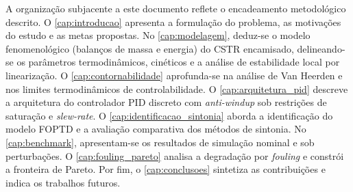 A organização subjacente a este documento reflete o encadeamento metodológico descrito. O \cref{cap:introducao} apresenta a formulação do problema, as motivações do estudo e as metas propostas. No \cref{cap:modelagem}, deduz-se o modelo fenomenológico (balanços de massa e energia) do CSTR encamisado, delineando-se os parâmetros termodinâmicos, cinéticos e a análise de estabilidade local por linearização. O \cref{cap:contornabilidade} aprofunda-se na análise de Van Heerden e nos limites termodinâmicos de controlabilidade. O \cref{cap:arquitetura_pid} descreve a arquitetura do controlador PID discreto com \textit{anti-windup} sob restrições de saturação e \textit{slew-rate}. O \cref{cap:identificacao_sintonia} aborda a identificação do modelo FOPTD e a avaliação comparativa dos métodos de sintonia. No \cref{cap:benchmark}, apresentam-se os resultados de simulação nominal e sob perturbações. O \cref{cap:fouling_pareto} analisa a degradação por \textit{fouling} e constrói a fronteira de Pareto. Por fim, o \cref{cap:conclusoes} sintetiza as contribuições e indica os trabalhos futuros.
